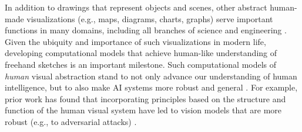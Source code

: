 \documentclass{article}
\begin{document}
In addition to drawings that represent objects and scenes, other abstract human-made visualizations (e.g., maps, diagrams, charts, graphs) serve important functions in many domains, including all branches of science and engineering \cite{tufte1986visual, tversky2000some, hegarty2011cognitive,chen2020foundations, card1999readings}. 
Given the ubiquity and importance of such visualizations in modern life, developing computational models that achieve human-like understanding of freehand sketches is an important milestone.
Such computational models of \textit{human} visual abstraction stand to not only advance our understanding of human intelligence, but to also make AI systems more robust and general \cite{hendrycks2019benchmarking, madry2017towards,geirhos2018generalisation}. 
For example, prior work has found that incorporating principles based on the structure and function of the human visual system have led to vision models that are more robust (e.g., to adversarial attacks) \cite{battleday2020capturing, li2023recognizing, fel2022aligning}.
\vspace{-1 em}
\end{document}
